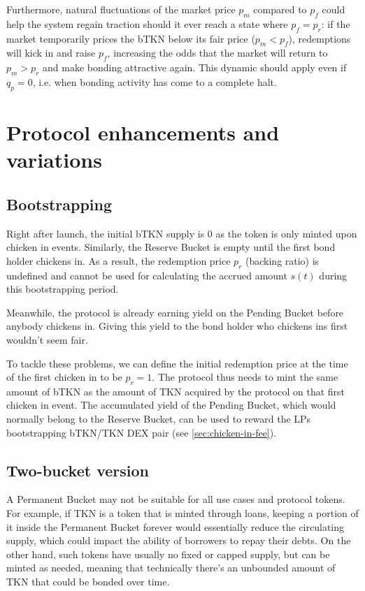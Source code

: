 \documentclass{article}
\begin{document}
Furthermore, natural fluctuations of the market price $p_m$ compared to $p_f$ could help the system regain traction should it ever reach a state where $p_f = p_r$: if the market temporarily prices the bTKN below its fair price ($p_m < p_f$), redemptions will kick in and raise $p_f$, increasing the odds that the market will return to $p_m > p_r$ and make bonding attractive again. This dynamic should apply even if $q_p = 0$, i.e. when bonding activity has come to a complete halt.

\section{Protocol enhancements and variations}
\subsection{Bootstrapping}
  \label{sec:bootstrapping}
Right after launch, the initial bTKN supply is 0 as the token is only minted upon chicken in events. Similarly, the Reserve Bucket is empty until the first bond holder chickens in. As a result, the redemption price $p_r$ (backing ratio) is undefined and cannot be used for calculating the accrued amount $s(t)$ during this bootstrapping period.

Meanwhile, the protocol is already earning yield on the Pending Bucket before anybody chickens in. Giving this yield to the bond holder who chickens ins first wouldn't seem fair. 

To tackle these problems, we can define the initial redemption price at the time of the first chicken in to be $p_r = 1$. The protocol thus needs to mint the same amount of bTKN as the amount of TKN acquired by the protocol on that first chicken in event. The accumulated yield of the Pending Bucket, which would normally belong to the Reserve Bucket, can be used to reward the LPs bootstrapping bTKN/TKN DEX pair (see \ref{sec:chicken-in-fee}).

\subsection{Two-bucket version}
\label{sec:two-bucket}
A Permanent Bucket may not be suitable for all use cases and protocol tokens. For example, if TKN is a token that is minted through loans, keeping a portion of it inside the Permanent Bucket forever would essentially reduce the circulating supply, which could impact the ability of borrowers to repay their debts. On the other hand, such tokens have usually no fixed or capped supply, but can be minted as needed, meaning that technically there's an unbounded amount of TKN that could be bonded over time.
\end{document}
